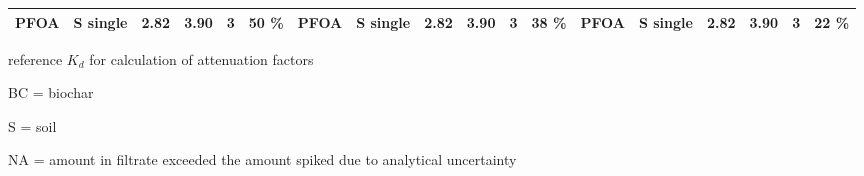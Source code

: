 \begin{sidewaystable}
{\begin{threeparttable}
\begin{tabular}{llllllllllllllllll}
PFOA     & S single       & 2.82   & 3.90      & 3  & 50 \%                          & PFOA     & S single       & 2.82   & 3.90      & 3  & 38 \%                          & PFOA     & S single       & 2.82   & 3.90      & 3  & 22 \%                         \\ \bottomrule
\end{tabular}
\begin{tablenotes}
\item * reference $K_d$ for calculation of attenuation factors
\item BC = biochar
\item S = soil
\item NA = amount in filtrate exceeded the amount spiked due to analytical uncertainty
\end{tablenotes}
\end{threeparttable}}
\end{sidewaystable}

